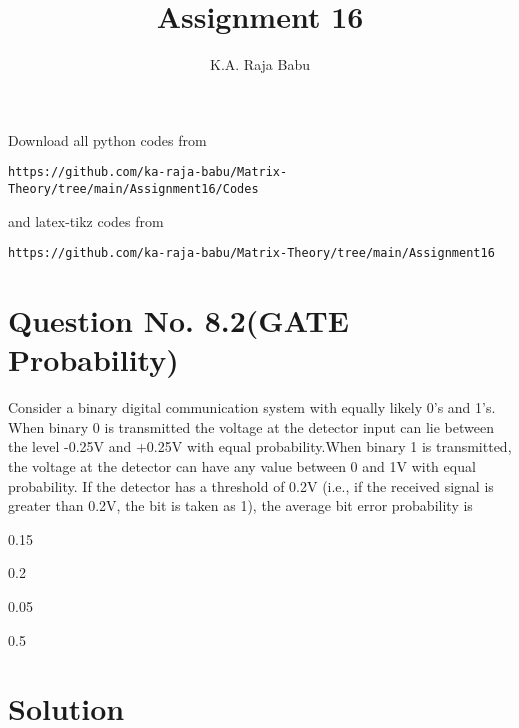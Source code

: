 \documentclass[journal,12pt,twocolumn]{IEEEtran}
\begin{document}
\makeatother
\let\StandardTheFigure\thefigure
\let\vec\mathbf
\renewcommand{\thefigure}{\theproblem}
\def\putbox#1#2#3{\makebox[0in][l]{\makebox[#1][l]{}\raisebox{\baselineskip}[0in][0in]{\raisebox{#2}[0in][0in]{#3}}}}
     \def\rightbox#1{\makebox[0in][r]{#1}}
     \def\centbox#1{\makebox[0in]{#1}}
     \def\topbox#1{\raisebox{-\baselineskip}[0in][0in]{#1}}
     \def\midbox#1{\raisebox{-0.5\baselineskip}[0in][0in]{#1}}
\vspace{3cm}
\title{Assignment 16}
\author{K.A. Raja Babu}
\maketitle
\newpage
\bigskip
\renewcommand{\thefigure}{\theenumi}
\renewcommand{\thetable}{\theenumi}
Download all python codes from 
\begin{lstlisting}
https://github.com/ka-raja-babu/Matrix-Theory/tree/main/Assignment16/Codes
\end{lstlisting}
%
and latex-tikz codes from 
%
\begin{lstlisting}
https://github.com/ka-raja-babu/Matrix-Theory/tree/main/Assignment16
\end{lstlisting}
%
\section{Question No. 8.2(GATE Probability)}

Consider a binary digital communication system with equally likely 0’s and 1’s. When binary 0 is transmitted the voltage at the detector input can lie between the level -0.25V and +0.25V with equal probability.When binary 1 is transmitted, the voltage at the detector can have any value between 0 and 1V with equal probability. If the detector has a threshold of 0.2V (i.e., if the received signal is greater than 0.2V, the bit is taken as 1), the average bit error probability is

\begin{enumerate}
\begin{multicols}{4}
\setlength\itemsep{2em}
\item 0.15
\item 0.2
\item 0.05
\item 0.5
\end{multicols}
\end{enumerate}

\section{Solution}
\end{document}
